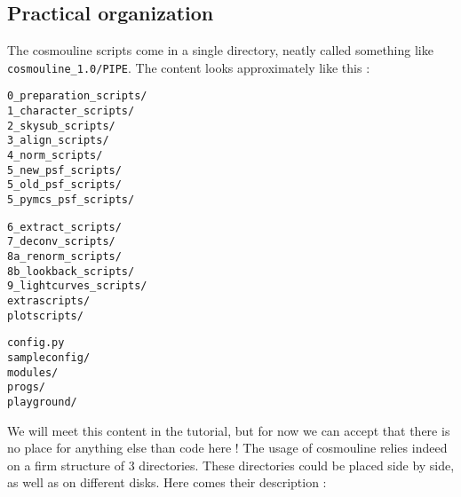 \subsection{Practical organization}

The cosmouline scripts come in a single directory, neatly called something like\\ \verb+cosmouline_1.0/PIPE+. The content looks approximately like this :

\vspace{0.5cm}
\begin{minipage}[t]{4cm}
\begin{verbatim}
0_preparation_scripts/	
1_character_scripts/	
2_skysub_scripts/	
3_align_scripts/	
4_norm_scripts/		
5_new_psf_scripts/
5_old_psf_scripts/
5_pymcs_psf_scripts/
\end{verbatim}
\end{minipage}
\hspace{0.5cm}
\begin{minipage}[t]{4cm}
\begin{verbatim}
6_extract_scripts/	
7_deconv_scripts/
8a_renorm_scripts/
8b_lookback_scripts/
9_lightcurves_scripts/
extrascripts/
plotscripts/	
\end{verbatim}
\end{minipage}
\hspace{0.5cm}
\begin{minipage}[t]{4cm}
\begin{verbatim}
config.py	
sampleconfig/
modules/ 
progs/
playground/
\end{verbatim}
\end{minipage}
\vspace{0.5cm}

We will meet this content in the tutorial, but for now we can accept that there is no place for anything else than code here ! The usage of cosmouline relies indeed on a firm structure of 3 directories. These directories could be placed side by side, as well as on different disks. Here comes their description :


